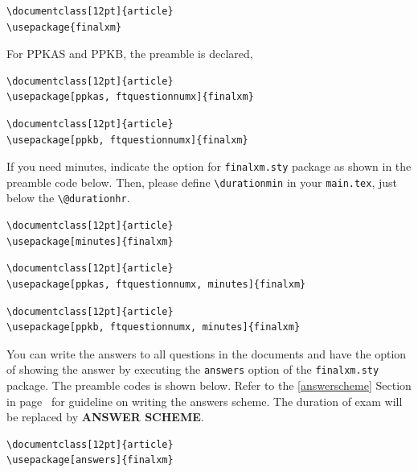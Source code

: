 \documentclass[12pt]{article}
\begin{document}
\begin{lstlisting}[basicstyle=\footnotesize, frame=single]
\documentclass[12pt]{article}	
\usepackage{finalxm}	
\end{lstlisting}

\clearpage  
For PPKAS and PPKB, the preamble is declared, 

\begin{lstlisting}[basicstyle=\footnotesize, frame=single]
% For PPKAS
\documentclass[12pt]{article}	
\usepackage[ppkas, ftquestionnumx]{finalxm}	
\end{lstlisting}

\begin{lstlisting}[basicstyle=\footnotesize, frame=single]
% For PPKB
\documentclass[12pt]{article}	
\usepackage[ppkb, ftquestionnumx]{finalxm}	
\end{lstlisting}

\bigskip
If you need minutes, indicate the option for \verb|finalxm.sty| package as shown in the preamble code below. Then, please define \verb|\durationmin| in your \verb|main.tex|, just below the \verb|\@durationhr|. 

\begin{lstlisting}[basicstyle=\footnotesize, frame=single]
% Standard
\documentclass[12pt]{article}	
\usepackage[minutes]{finalxm} 
\end{lstlisting}

\begin{lstlisting}[basicstyle=\footnotesize, frame=single]
% For PPKAS
\documentclass[12pt]{article}	
\usepackage[ppkas, ftquestionnumx, minutes]{finalxm}	
\end{lstlisting}

\begin{lstlisting}[basicstyle=\footnotesize, frame=single]
% For PPKB
\documentclass[12pt]{article}	
\usepackage[ppkb, ftquestionnumx, minutes]{finalxm}	
\end{lstlisting}

You can write the answers to all questions in the documents and have the option of showing the answer by executing the \verb|answers| option of the \verb|finalxm.sty| package. The preamble codes is shown below. Refer to the \ref{answerscheme} Section in page~\pageref{answerscheme} for guideline on writing the answers scheme. The duration of exam will be replaced by \textbf{ANSWER SCHEME}. 

\begin{lstlisting}[basicstyle=\footnotesize, frame=single]
% Standard
\documentclass[12pt]{article}	
\usepackage[answers]{finalxm} 
\end{lstlisting}
\end{document}

